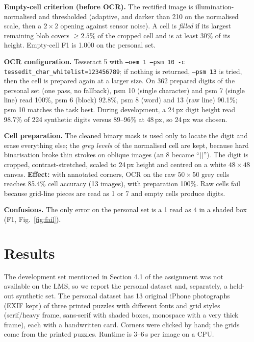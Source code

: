 \documentclass[conference]{IEEEtran}%
\begin{document}
\textbf{Empty-cell criterion (before OCR).} The rectified image is
illumination-normalised and thresholded (adaptive, and darker than 210 on the
normalised scale, then a $2\times2$ opening against sensor noise). A cell is
\emph{filled} if its largest remaining blob covers $\ge2.5\%$ of the cropped
cell and is at least 30\% of its height. Empty-cell F1 is 1.000 on the
personal set.

\textbf{OCR configuration.} Tesseract 5 with
\texttt{--oem 1 --psm 10 -c tessedit\_char\_whitelist=123456789}; if nothing
is returned, \texttt{--psm 13} is tried, then the cell is prepared again at a
larger size. On 362 prepared digits of the personal set (one pass, no
fallback), psm 10 (single character) and psm 7 (single line) read 100\%,
psm 6 (block) 92.8\%, psm 8 (word) and 13 (raw line) 90.1\%; psm 10 matches
the task best. During development, a 24\,px digit height read 98.7\% of 224
synthetic digits versus 89--96\% at 48\,px, so 24\,px was chosen.

\textbf{Cell preparation.} The cleaned binary mask is used only to locate the
digit and erase everything else; the \emph{grey levels} of the normalised cell
are kept, because hard binarisation broke thin strokes on oblique images
(an 8 became ``$||$''). The digit is cropped, contrast-stretched, scaled to
24\,px height and centred on a white $48\times48$ canvas.
\textbf{Effect:} with annotated corners, OCR on the raw $50\times50$ grey cells reaches
85.4\% cell accuracy (13 images), with preparation 100\%. Raw cells fail
because grid-line pieces are read as 1 or 7 and empty cells produce digits.

\textbf{Confusions.} The only error on the personal set is a 1 read as 4 in a
shaded box (F1, Fig.~\ref{fig:fail}).

\section{Results}
The development set mentioned in Section 4.1 of the assignment was not
available on the LMS, so we report the personal dataset and, separately, a
held-out synthetic set. The personal dataset has 13 original iPhone
photographs (EXIF kept) of three printed puzzles with different fonts and grid
styles (serif/heavy frame, sans-serif with shaded boxes, monospace with a very
thick frame), each with a handwritten card. Corners were clicked by hand; the
grids come from the printed puzzles. Runtime is 3--6\,s per image on a CPU.
\end{document}
